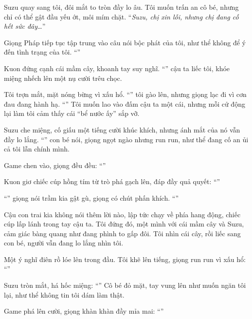 \documentclass[../main.tex]{subfiles}
\begin{document}
Suzu quay sang tôi, đôi mắt to tròn đầy lo âu. Tôi muốn trấn an cô bé, nhưng chỉ có thể gật đầu yếu ớt, môi mím chặt. ``\textit{Suzu, chị xin lỗi, nhưng chị đang cố hết sức đây\dots}''

Giọng Pháp tiếp tục tập trung vào câu nói bộc phát của tôi, như thể không để ý đến tình trạng của tôi. ``''

Kuon đứng cạnh cái mầm cây, khoanh tay suy nghĩ. ``'' cậu ta liếc tôi, khóe miệng nhếch lên một nụ cười trêu chọc.

Tôi trợn mắt, mặt nóng bừng vì xấu hổ. ``'' tôi gào lên, nhưng giọng lạc đi vì cơn đau đang hành hạ. ``'' Tôi muốn lao vào đấm cậu ta một cái, nhưng mỗi cử động lại làm tôi cảm thấy cái ``bể nước ấy'' sắp vỡ.

Suzu che miệng, cố giấu một tiếng cười khúc khích, nhưng ánh mắt của nó vẫn đầy lo lắng. ``'' con bé nói, giọng ngọt ngào nhưng run run, như thể đang cố an ủi cả tôi lẫn chính mình.

Game chen vào, giọng đều đều: ``''

Kuon giơ chiếc cúp hồng tím từ trò phá gạch lên, đáp đầy quả quyết: ``''

``'' giọng nói trầm kia gật gù, giọng có chút phấn khích. ``''

Cậu con trai kia không nói thêm lời nào, lập tức chạy về phía hang động, chiếc cúp lấp lánh trong tay cậu ta. Tôi đứng đó, một mình với cái mầm cây và Suzu, cảm giác bàng quang như đang phình to gấp đôi. Tôi nhìn cái cây, rồi liếc sang con bé, người vẫn đang lo lắng nhìn tôi.

Một ý nghĩ điên rồ lóe lên trong đầu. Tôi khẽ lên tiếng, giọng run run vì xấu hổ: ``''

Suzu tròn mắt, há hốc miệng: ``'' Cô bé đỏ mặt, tay vung lên như muốn ngăn tôi lại, như thể không tin tôi dám làm thật.

Game phá lên cười, giọng khàn khàn đầy mỉa mai: ``''
\end{document}
